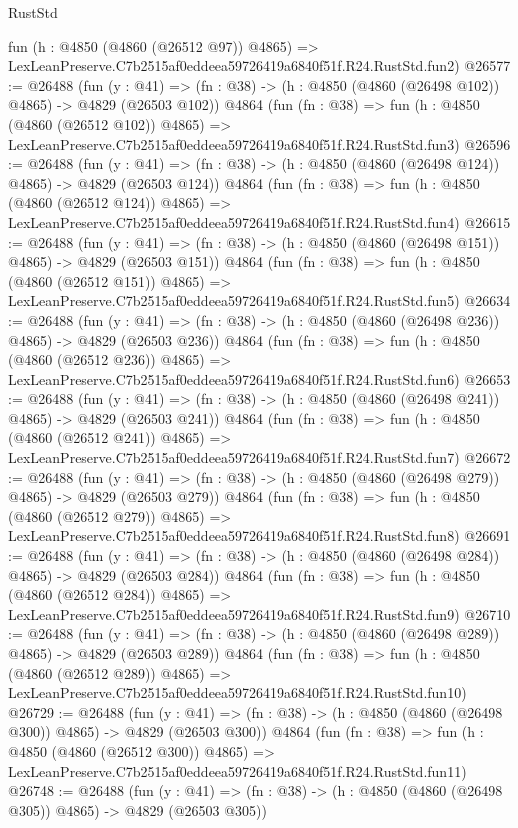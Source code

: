 \begin{lexlean}{RustStd}
\begin{coremodule}
    fun (h : @4850 (@4860 (@26512 @97)) @4865) =>
    LexLeanPreserve.C7b2515af0eddeea59726419a6840f51f.R24.RustStd.fun2)
@26577 := @26488
    (fun (y : @41) => (fn : @38) -> (h : @4850 (@4860 (@26498 @102)) @4865) -> @4829 (@26503 @102))
    @4864
    (fun (fn : @38) =>
    fun (h : @4850 (@4860 (@26512 @102)) @4865) =>
    LexLeanPreserve.C7b2515af0eddeea59726419a6840f51f.R24.RustStd.fun3)
@26596 := @26488
    (fun (y : @41) => (fn : @38) -> (h : @4850 (@4860 (@26498 @124)) @4865) -> @4829 (@26503 @124))
    @4864
    (fun (fn : @38) =>
    fun (h : @4850 (@4860 (@26512 @124)) @4865) =>
    LexLeanPreserve.C7b2515af0eddeea59726419a6840f51f.R24.RustStd.fun4)
@26615 := @26488
    (fun (y : @41) => (fn : @38) -> (h : @4850 (@4860 (@26498 @151)) @4865) -> @4829 (@26503 @151))
    @4864
    (fun (fn : @38) =>
    fun (h : @4850 (@4860 (@26512 @151)) @4865) =>
    LexLeanPreserve.C7b2515af0eddeea59726419a6840f51f.R24.RustStd.fun5)
@26634 := @26488
    (fun (y : @41) => (fn : @38) -> (h : @4850 (@4860 (@26498 @236)) @4865) -> @4829 (@26503 @236))
    @4864
    (fun (fn : @38) =>
    fun (h : @4850 (@4860 (@26512 @236)) @4865) =>
    LexLeanPreserve.C7b2515af0eddeea59726419a6840f51f.R24.RustStd.fun6)
@26653 := @26488
    (fun (y : @41) => (fn : @38) -> (h : @4850 (@4860 (@26498 @241)) @4865) -> @4829 (@26503 @241))
    @4864
    (fun (fn : @38) =>
    fun (h : @4850 (@4860 (@26512 @241)) @4865) =>
    LexLeanPreserve.C7b2515af0eddeea59726419a6840f51f.R24.RustStd.fun7)
@26672 := @26488
    (fun (y : @41) => (fn : @38) -> (h : @4850 (@4860 (@26498 @279)) @4865) -> @4829 (@26503 @279))
    @4864
    (fun (fn : @38) =>
    fun (h : @4850 (@4860 (@26512 @279)) @4865) =>
    LexLeanPreserve.C7b2515af0eddeea59726419a6840f51f.R24.RustStd.fun8)
@26691 := @26488
    (fun (y : @41) => (fn : @38) -> (h : @4850 (@4860 (@26498 @284)) @4865) -> @4829 (@26503 @284))
    @4864
    (fun (fn : @38) =>
    fun (h : @4850 (@4860 (@26512 @284)) @4865) =>
    LexLeanPreserve.C7b2515af0eddeea59726419a6840f51f.R24.RustStd.fun9)
@26710 := @26488
    (fun (y : @41) => (fn : @38) -> (h : @4850 (@4860 (@26498 @289)) @4865) -> @4829 (@26503 @289))
    @4864
    (fun (fn : @38) =>
    fun (h : @4850 (@4860 (@26512 @289)) @4865) =>
    LexLeanPreserve.C7b2515af0eddeea59726419a6840f51f.R24.RustStd.fun10)
@26729 := @26488
    (fun (y : @41) => (fn : @38) -> (h : @4850 (@4860 (@26498 @300)) @4865) -> @4829 (@26503 @300))
    @4864
    (fun (fn : @38) =>
    fun (h : @4850 (@4860 (@26512 @300)) @4865) =>
    LexLeanPreserve.C7b2515af0eddeea59726419a6840f51f.R24.RustStd.fun11)
@26748 := @26488
    (fun (y : @41) => (fn : @38) -> (h : @4850 (@4860 (@26498 @305)) @4865) -> @4829 (@26503 @305))

\end{coremodule}
\end{lexlean}
